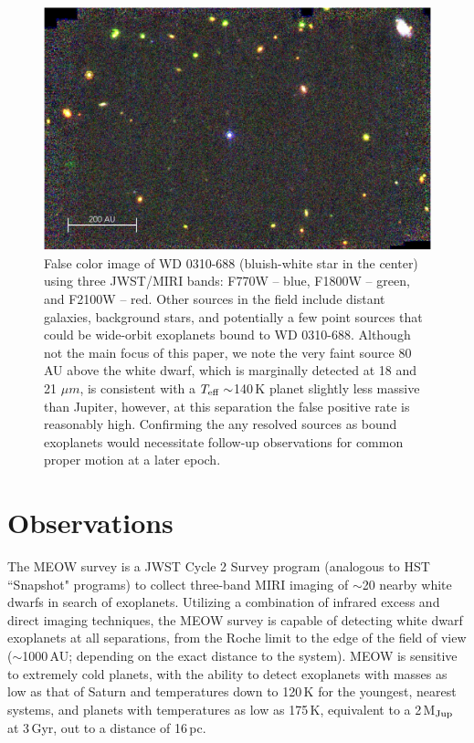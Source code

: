 \documentclass[twocolumn]{aastex631}
\begin{document}
\begin{figure}
\centering
\includegraphics[width=1\textwidth]{Figures/WD0310Image.pdf}
\caption{False color image of WD 0310-688 (bluish-white star in the center) using three JWST/MIRI bands: F770W -- blue, F1800W -- green, and F2100W -- red. Other sources in the field include distant galaxies, background stars, and potentially a few point sources that could be wide-orbit exoplanets bound to WD 0310-688. Although not the main focus of this paper, we note the very faint source 80\,AU above the white dwarf, which is marginally detected at 18 and 21 $\mu m$, is consistent with a $T_{\rm eff}\sim$140\,K planet slightly less massive than Jupiter, however, at this separation the false positive rate is reasonably high. Confirming the any resolved sources as bound exoplanets would necessitate follow-up observations for common proper motion at a later epoch.}
\label{MIRIim}
\vspace{3mm}
\end{figure}

\section{Observations} \label{sec:obs}

The MEOW survey is a JWST Cycle 2 Survey program (analogous to HST ``Snapshot" programs) to collect three-band MIRI imaging of $\sim$20 nearby white dwarfs in search of exoplanets. Utilizing a combination of infrared excess and direct imaging techniques, the MEOW survey is capable of detecting white dwarf exoplanets at all separations, from the Roche limit to the edge of the field of view ($\sim$1000\,AU; depending on the exact distance to the system).
MEOW is sensitive to extremely cold planets, with the ability to detect exoplanets with masses as low as that of Saturn and temperatures down to 120\,K for the youngest, nearest systems, and planets with temperatures as low as 175\,K, equivalent to a 2\,M$_{\rm Jup}$ at 3\,Gyr, out to a distance of 16\,pc. 
\end{document}
